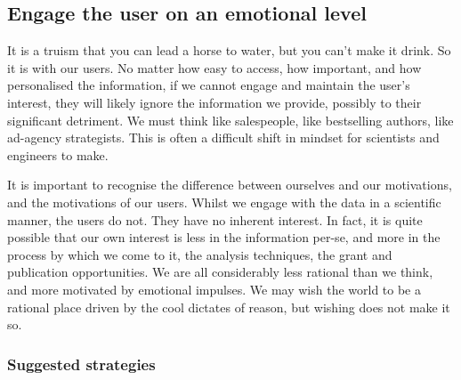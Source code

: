\subsection{Engage the user on an emotional level}
It is a truism that you can lead a horse to water, but you can't make it drink. So it is with our users.
No matter how easy to access, how important, and how personalised the information, if we cannot engage and maintain the user's interest,
they will likely ignore the information we provide, possibly to their significant detriment.
We must think like salespeople, like bestselling authors, like ad-agency strategists.
This is often a difficult shift in mindset for scientists and engineers to make.

It is important to recognise the difference between ourselves and our motivations, and the motivations of our users. Whilst we engage with the data in a scientific
manner, the users do not. They have no inherent interest. In fact, it is quite possible that our own interest is less in the information per-se, and more in the process
by which we come to it, the analysis techniques, the grant and publication opportunities. We are all considerably less rational than we think, and more motivated by
emotional impulses. We may wish the world to be a rational place driven by the cool dictates of reason, but wishing does not make it so. \\

\subsubsection*{Suggested strategies}


